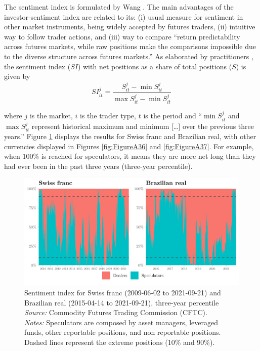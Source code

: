 \documentclass[a4paper, twoside]{templates/ociamthesis}
\begin{document}
The sentiment index is formulated by Wang \autocite*{wang2001,wang2004}. The main advantages of the investor-sentiment index are related to its: (i) usual measure for sentiment in other market instruments, being widely accepted by futures traders, (ii) intuitive way to follow trader actions, and (iii) way to compare ``return predictability across futures markets, while raw positions make the comparisons impossible due to the diverse structure across futures markets.'' \autocite[ 933]{wang2001} As elaborated by practitioners \autocite{freecotdata2021}, the sentiment index (\(SI\)) with net positions as a share of total positions (\(S\)) is given by
\begin{equation}
SI_{it}^{j} = \frac{S_{it}^{j}-\min{S_{it}^{j}}}{\max{S_{it}^{j}}-\min{S_{it}^{j}}}
\label{eq:17}
\end{equation}

\noindent where \(j\) is the market, \(i\) is the trader type, \(t\) is the period and ``\(\min{S_{it}^{j}}\) and \(\max{S_{it}^{j}}\) represent historical maximum and minimum {[}\ldots{]} over the previous three years.'' \autocite[ 933]{wang2001} Figure \ref{fig:Figure29} displays the results for Swiss franc and Brazilian real, with other currencies displayed in Figures \ref{fig:FigureA36} and \ref{fig:FigureA37}. For example, when 100\% is reached for speculators, it means they are more net long than they had ever been in the past three years (three-year percentile).

\begin{figure}[!ht]

{\centering \includegraphics[width=0.80\columnwidth]{figure/CHFBRL} 

}

\caption[Sentiment index for Swiss franc (2009-06-02 to 2021-09-21) and Brazilian real (2015-04-14 to 2021-09-21), three-year percentile]{Sentiment index for Swiss franc (2009-06-02 to 2021-09-21) and Brazilian real (2015-04-14 to 2021-09-21), three-year percentile \\ \scriptsize \textit{Source:} Commodity Futures Trading Commission (CFTC). \\ \scriptsize \textit{Notes:} Speculators are composed by asset managers, leveraged funds, other reportable positions, and non reportable positions. Dashed lines represent the extreme positions (10\% and 90\%).}\label{fig:Figure29}
\end{figure}
\end{document}
